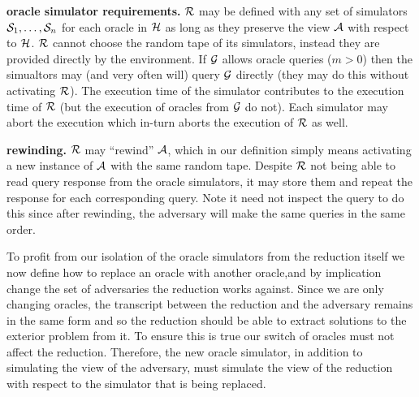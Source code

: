 \begin{definition}
  \textbf{oracle simulator requirements.} $\mathcal{R}$ may be defined with any set of simulators $\mathcal{S}_1,\dots,\mathcal{S}_n$ for each oracle in $\mathcal{H}$ as long as they preserve the view $\mathcal{A}$ with respect to $\mathcal{H}$.
  $\mathcal{R}$ cannot choose the random tape of its simulators, instead they are provided directly by the environment.
  If $\mathcal{G}$ allows oracle queries ($m > 0$) then the simualtors may (and very often will) query $\mathcal{G}$ directly (they may do this without activating $\mathcal{R}$).
  The execution time of the simulator contributes to the execution time of $\mathcal{R}$ (but the execution of oracles from $\mathcal{G}$ do not).
  Each simulator may abort the execution which in-turn aborts the execution of $\mathcal{R}$ as well.

  \textbf{rewinding.} $\mathcal{R}$ may ``rewind'' $\mathcal{A}$, which in our definition simply means activating a new instance of $\mathcal{A}$ with the same random tape.
  Despite $\mathcal{R}$ not being able to read query response from the oracle simulators, it may store them and repeat the response for each corresponding query.
  Note it need not inspect the query to do this since after rewinding, the adversary will make the same queries in the same order.
\end{definition}




To profit from our isolation of the oracle simulators from the reduction itself we now define how to replace an oracle with another oracle,and by implication change the set of adversaries the reduction works against.
Since we are only changing oracles, the transcript between the reduction and the adversary remains in the same form and so the reduction should be able to extract solutions to the exterior problem from it.
To ensure this is true our switch of oracles must not affect the reduction.
Therefore, the new oracle simulator, in addition to simulating the view of the adversary, must simulate the view of the reduction with respect to the simulator that is being replaced.

